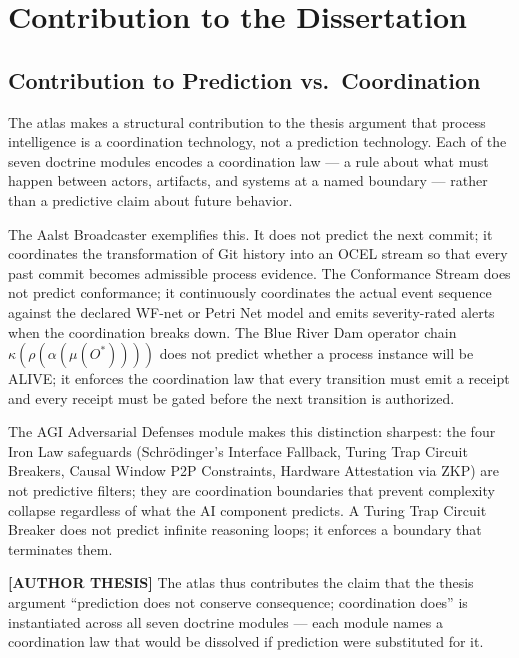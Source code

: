 
\section{Contribution to the Dissertation}
\label{sec:atlas-contribution}

\subsection{Contribution to Prediction vs.~Coordination}
\label{sec:atlas-contribution-prediction}

The atlas makes a structural contribution to the thesis argument that process
intelligence is a coordination technology, not a prediction technology. Each of
the seven doctrine modules encodes a coordination law --- a rule about what must
happen between actors, artifacts, and systems at a named boundary --- rather than
a predictive claim about future behavior.

The Aalst Broadcaster exemplifies this. It does not predict the next commit; it
coordinates the transformation of Git history into an OCEL stream so that every
past commit becomes admissible process evidence. The Conformance Stream does not
predict conformance; it continuously coordinates the actual event sequence
against the declared WF-net or Petri Net model and emits severity-rated alerts
when the coordination breaks down. The Blue River Dam operator chain
$\kappa(\rho(\alpha(\mu(O^*))))$ does not predict whether a process instance
will be ALIVE; it enforces the coordination law that every transition must emit
a receipt and every receipt must be gated before the next transition is
authorized.

The AGI Adversarial Defenses module makes this distinction sharpest: the four
Iron Law safeguards (Schr\"odinger's Interface Fallback, Turing Trap Circuit
Breakers, Causal Window P2P Constraints, Hardware Attestation via ZKP) are not
predictive filters; they are coordination boundaries that prevent complexity
collapse regardless of what the AI component predicts. A Turing Trap Circuit
Breaker does not predict infinite reasoning loops; it enforces a boundary that
terminates them.

\textbf{[AUTHOR THESIS]} The atlas thus contributes the claim that the thesis
argument ``prediction does not conserve consequence; coordination does'' is
instantiated across all seven doctrine modules --- each module names a
coordination law that would be dissolved if prediction were substituted for it.

